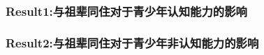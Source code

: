 \documentclass{beamer}
\begin{document}
\begin{frame}
	\frametitle{Result1:与祖辈同住对于青少年认知能力的影响}
\end{frame}

\begin{frame}
	\frametitle{Result2:与祖辈同住对于青少年非认知能力的影响}
\end{frame}
\end{document}
